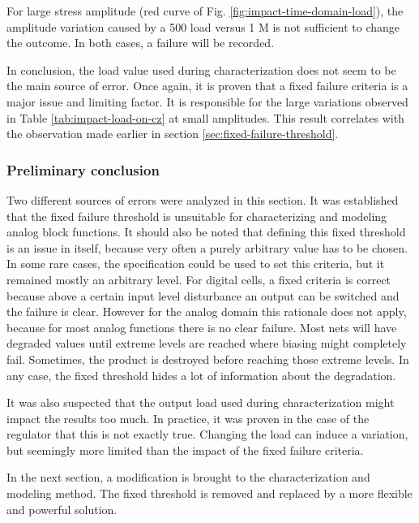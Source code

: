 For large stress amplitude (red curve of Fig. \ref{fig:impact-time-domain-load}), the amplitude variation caused by a 500 \textOmega{} load versus 1 M\textOmega{} is not sufficient to change the outcome.
In both cases, a failure will be recorded.

In conclusion, the load value used during characterization does not seem to be the main source of error.
Once again, it is proven that a fixed failure criteria is a major issue and limiting factor.
It is responsible for the large variations observed in Table \ref{tab:impact-load-on-cz} at small amplitudes.
This result correlates with the observation made earlier in section \ref{sec:fixed-failure-threshold}.

\subsubsection{Preliminary conclusion}

Two different sources of errors were analyzed in this section.
It was established that the fixed failure threshold is unsuitable for characterizing and modeling analog block functions.
It should also be noted that defining this fixed threshold is an issue in itself, because very often a purely arbitrary value has to be chosen.
In some rare cases, the specification could be used to set this criteria, but it remained mostly an arbitrary level.
For digital cells, a fixed criteria is correct because above a certain input level disturbance an output can be switched and the failure is clear.
However for the analog domain this rationale does not apply, because for most analog functions there is no clear failure.
Most nets will have degraded values until extreme levels are reached where biasing might completely fail.
Sometimes, the product is destroyed before reaching those extreme levels.
In any case, the fixed threshold hides a lot of information about the degradation.

It was also suspected that the output load used during characterization might impact the results too much.
In practice, it was proven in the case of the regulator that this is not exactly true.
Changing the load can induce a variation, but seemingly more limited than the impact of the fixed failure criteria.

In the next section, a modification is brought to the characterization and modeling method.
The fixed threshold is removed and replaced by a more flexible and powerful solution.
